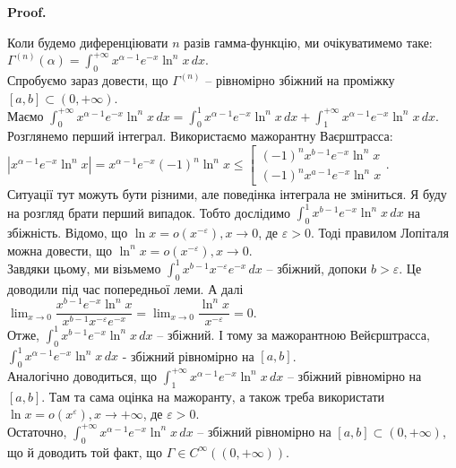 \documentclass[a4paper, 10pt]{article}
\makeatletter
\def\huge{\displaystyle}
\def\qed{$\blacksquare$}
\theoremstyle{theoremdd}
\theoremstyle{theoremdd}
\theoremstyle{theoremdd}
\theoremstyle{theoremdd}
\theoremstyle{theoremdd}
\theoremstyle{theoremdd}
\theoremstyle{theoremdd}
\theoremstyle{theoremdd}
\theoremstyle{theoremdd}
\renewenvironment{proof}[1][Proof.\\]{\par
\pushQED{\hfill \qed}%
\normalfont \topsep6\p@\@plus6\p@\relax
\trivlist
\item\relax
{\bfseries
#1\@addpunct{.}}\hspace\labelsep\ignorespaces
}{%
\popQED\endtrivlist\@endpefalse
}
\makeatother
\begin{document}
\begin{proof}
Коли будемо диференціювати $n$ разів гамма-функцію, ми очікуватимемо таке:\\
$\Gamma^{(n)}(\alpha) = \huge\int_0^{+\infty} x^{\alpha-1}e^{-x} \ln^n x\,dx$.\\
Спробуємо зараз довести, що $\Gamma^{(n)}$ -- рівномірно збіжний на проміжку $[a,b] \subset (0,+\infty)$.\\
Маємо $\huge\int_0^{+\infty} x^{\alpha-1}e^{-x} \ln^n x\,dx = \huge\int_0^{1} x^{\alpha-1}e^{-x} \ln^n x\,dx + \huge\int_1^{+\infty} x^{\alpha-1}e^{-x} \ln^n x\,dx$.\\
Розглянемо перший інтеграл. Використаємо мажорантну Ваєрштрасса:\\
$|x^{\alpha-1}e^{-x} \ln^n x| = x^{\alpha-1}e^{-x} (-1)^n \ln^n x \leq \left[ \begin{gathered} (-1)^n x^{b-1}e^{-x}\ln^n x \\ (-1)^n x^{a-1}e^{-x}\ln^n x \end{gathered} \right.$.\\
Ситуації тут можуть бути різними, але поведінка інтеграла не зміниться. Я буду на розгляд брати перший випадок. Тобто дослідимо $\huge\int_0^{1} x^{b-1}e^{-x}\ln^n x\,dx$ на збіжність. Відомо, що $\ln x = o(x^{-\varepsilon}), x \to 0$, де $\varepsilon > 0$. Тоді правилом Лопіталя можна довести, що $\ln^n x = o(x^{-\varepsilon}), x \to 0$.\\
Завдяки цьому, ми візьмемо $\huge\int_0^1 x^{b-1} x^{-\varepsilon} e^{-x}\,dx$ -- збіжний, допоки $b > \varepsilon$. Це доводили під час попередньої леми. А далі $\huge\lim_{x \to 0} \dfrac{x^{b-1}e^{-x} \ln^n x}{x^{b-1} x^{-\varepsilon} e^{-x}} = \lim_{x \to 0} \dfrac{\ln^n x}{x^{-\varepsilon}} = 0$.\\
Отже, $\huge\int_0^{1} x^{b-1}e^{-x} \ln^n x\,dx$ -- збіжний. І тому за мажорантною Вейєрштрасса, $\huge\int_0^1 x^{\alpha-1}e^{-x} \ln^n x\,dx$ - збіжний рівномірно на $[a,b]$.
\\
Аналогічно доводиться, що $\huge\int_1^{+\infty} x^{\alpha-1} e^{-x}\ln^n x\,dx$ -- збіжний рівномірно на $[a,b]$. Там та сама оцінка на мажоранту, а також треба використати $\ln x = o(x^{\varepsilon}), x \to +\infty$, де $\varepsilon >0$.\\ 
Остаточно, $\huge\int_0^{+\infty} x^{\alpha-1}e^{-x} \ln^n x\,dx$ -- збіжний рівномірно на $[a,b] \subset (0,+\infty)$, що й доводить той факт, що $\Gamma \in C^{\infty}((0,+\infty))$.
\end{proof}
\end{document}
